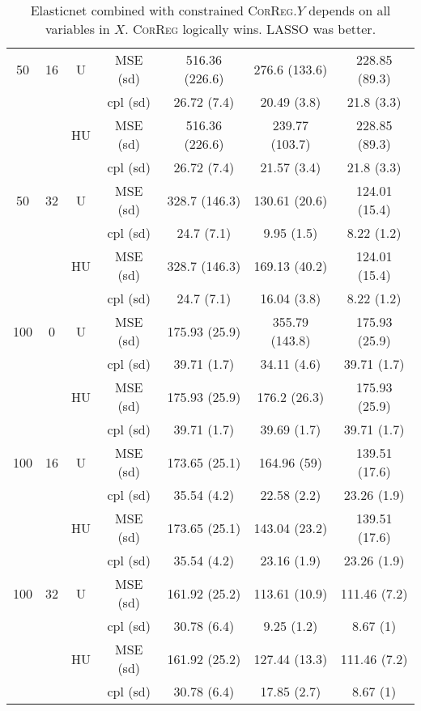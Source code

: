 \documentclass[11pt,a4paper]{article}
\begin{document}
\begin{table}[h!]
\begin{tabular}{|c|c|c|c|c|c|c|}
\hline %
50 & 16 & U&	MSE (sd) & 516.36 (226.6) & 276.6 (133.6) & 228.85 (89.3) \\
& & & cpl (sd) & 26.72 (7.4) & 20.49 (3.8) & 21.8 (3.3) \\
 &  &HU &MSE (sd) & 516.36 (226.6) & 239.77 (103.7) & 228.85 (89.3) \\
& & & cpl (sd) & 26.72 (7.4) & 21.57 (3.4) & 21.8 (3.3) \\
\hline %
50 & 32 & U&MSE (sd) & 328.7 (146.3) & 130.61 (20.6) & 124.01 (15.4) \\
& & & cpl (sd) & 24.7 (7.1) & 9.95 (1.5) & 8.22 (1.2) \\
 &  &HU &MSE (sd) & 328.7 (146.3) & 169.13 (40.2) & 124.01 (15.4) \\
& & &cpl (sd) & 24.7 (7.1) & 16.04 (3.8) & 8.22 (1.2) \\
\hline
\hline %
100 & 0 & U& MSE (sd) & 175.93 (25.9) & 355.79 (143.8) & 175.93 (25.9) \\
& & & cpl (sd) & 39.71 (1.7) & 34.11 (4.6) & 39.71 (1.7) \\
 &  &HU &  MSE (sd) & 175.93 (25.9) & 176.2 (26.3) & 175.93 (25.9) \\
& & &  cpl (sd) & 39.71 (1.7) & 39.69 (1.7) & 39.71 (1.7) \\
\hline %
100 & 16 & U&  MSE (sd) & 173.65 (25.1) & 164.96 (59) & 139.51 (17.6) \\
& & &  cpl (sd) & 35.54 (4.2) & 22.58 (2.2) & 23.26 (1.9) \\
 &  &HU &  MSE (sd) & 173.65 (25.1) & 143.04 (23.2) & 139.51 (17.6) \\
& & & cpl (sd) & 35.54 (4.2) & 23.16 (1.9) & 23.26 (1.9) \\
\hline %
100 & 32 & U&  MSE (sd) & 161.92 (25.2) & 113.61 (10.9) & 111.46 (7.2) \\
& & &  cpl (sd) & 30.78 (6.4) & 9.25 (1.2) & 8.67 (1) \\
 &  &HU &  MSE (sd) & 161.92 (25.2) & 127.44 (13.3) & 111.46 (7.2) \\
& & &cpl (sd) & 30.78 (6.4) & 17.85 (2.7) & 8.67 (1) \\
\hline
\end{tabular} 
\caption{Elasticnet combined with constrained \textsc{CorReg}.$Y$  depends on all variables in $X$. \textsc{CorReg} logically wins. LASSO was better.}\label{YXlinenet}
\end{table}
\end{document}
